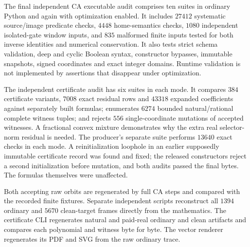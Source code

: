 The final independent CA executable audit comprises ten suites in ordinary
Python and again with optimization enabled. It includes $27412$ systematic
source/image predicate checks, $4448$ home-semantics checks, $1080$ independent
isolated-gate window inputs, and $835$ malformed finite inputs tested for both
inverse identities and numerical conservation. It also tests strict schema
validation, deep and cyclic Boolean syntax, constructor bypasses, immutable
snapshots, signed coordinates and exact integer domains. Runtime validation
is not implemented by assertions that disappear under optimization.

The independent certificate audit has six suites in each mode. It compares
$384$ certificate variants, $7008$ exact residual rows and $43318$ expanded
coefficients against separately built formulas; enumerates $6274$ bounded
natural/rational complete witness tuples; and rejects $556$ single-coordinate
mutations of accepted witnesses. A fractional convex mixture demonstrates
why the extra real selector-norm residual is needed. The producer's separate
suite performs $13640$ exact checks in each mode. A reinitialization loophole
in an earlier supposedly immutable certificate record was found and fixed;
the released constructors reject a second initialization before mutation, and
both audits passed the final bytes. The formulas themselves were unaffected.

Both accepting raw orbits are regenerated by full CA steps and compared with
the recorded finite fixtures. Separate independent scripts reconstruct all
$1394$ ordinary and $5670$ clean-target frames directly from the mathematics.
The certificate CLI regenerates natural and paid-real ordinary and clean
artifacts and compares each polynomial and witness byte for byte. The vector
renderer regenerates its PDF and SVG from the raw ordinary trace.
